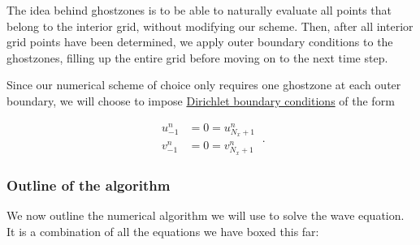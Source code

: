 \documentclass[a4paper,11pt]{article}
\begin{document}
The idea behind ghostzones is to be able to naturally evaluate all points that belong to the interior grid, without modifying our scheme. Then, after all interior grid points have been determined, we apply outer boundary conditions to the ghostzones, filling up the entire grid before moving on to the next time step.

Since our numerical scheme of choice only requires one ghostzone at each outer boundary, we will choose to impose \href{https://en.wikipedia.org/wiki/Dirichlet_boundary_condition}{Dirichlet boundary conditions} of the form

\begin{equation}
\boxed{
\begin{aligned}
u^{n}_{-1} &= 0 = u^{n}_{N_{x}+1}\\
v^{n}_{-1} &= 0 = v^{n}_{N_{x}+1}
\end{aligned}
}\ .
\end{equation}

\subsubsection{Outline of the algorithm}

We now outline the numerical algorithm we will use to solve the wave equation. It is a combination of all the equations we have boxed this far:
\end{document}
